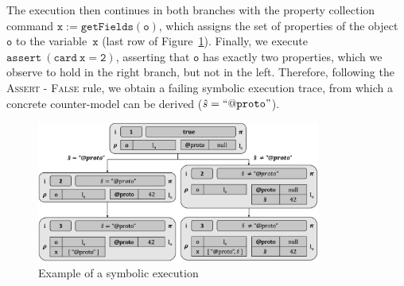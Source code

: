 The execution then continues in both branches with the property collection command $\mathtt{x := getFields(o)}$, which assigns the set of properties of the object $\mathtt{o}$ to the variable~$\mathtt{x}$ (last row of Figure~\ref{fig:sexecexample}). Finally, we execute $\mathtt{assert\ (card \ x = 2)}$, asserting that $\mathtt{o}$ has exactly two properties, which we observe to hold in the right branch, but not in the left.
Therefore, following the \textsc{Assert - False} rule, we obtain a failing symbolic execution trace, from which a concrete counter-model can be derived ($\hat{s} = \mathtt{``@proto"}$).

\begin{figure}[!t]
\centering
\includegraphics[width=0.83\textwidth]{symbSemEx.png}
\vspace*{-0.1cm}
\caption{Example of a \cosette symbolic execution}
\label{fig:sexecexample}
\vspace*{-0.3cm}
\end{figure}














